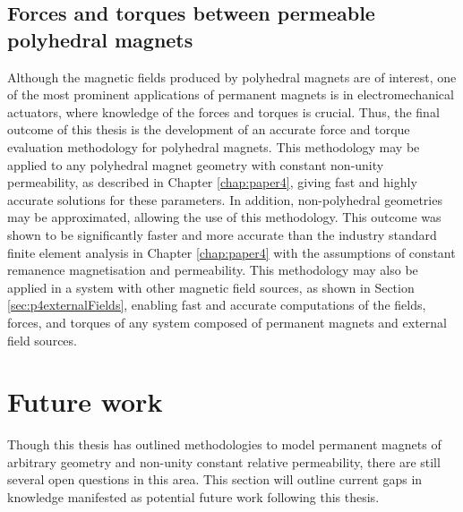 \subsection{Forces and torques between permeable polyhedral magnets}
Although the magnetic fields produced by polyhedral magnets are of interest, one of the most prominent applications of permanent magnets is in electromechanical actuators, where knowledge of the forces and torques is crucial. Thus, the final outcome of this thesis is the development of an accurate force and torque evaluation methodology for polyhedral magnets. This methodology may be applied to any polyhedral magnet geometry with constant non-unity permeability, as described in Chapter \ref{chap:paper4}, giving fast and highly accurate solutions for these parameters. In addition, non-polyhedral geometries may be approximated, allowing the use of this methodology. This outcome was shown to be significantly faster and more accurate than the industry standard finite element analysis in Chapter \ref{chap:paper4} with the assumptions of constant remanence magnetisation and permeability. This methodology may also be applied in a system with other magnetic field sources, as shown in Section \ref{sec:p4externalFields}, enabling fast and accurate computations of the fields, forces, and torques of any system composed of permanent magnets and external field sources.

\section{Future work}
Though this thesis has outlined methodologies to model permanent magnets of arbitrary geometry and non-unity constant relative permeability, there are still several open questions in this area. This section will outline current gaps in knowledge manifested as potential future work following this thesis.

